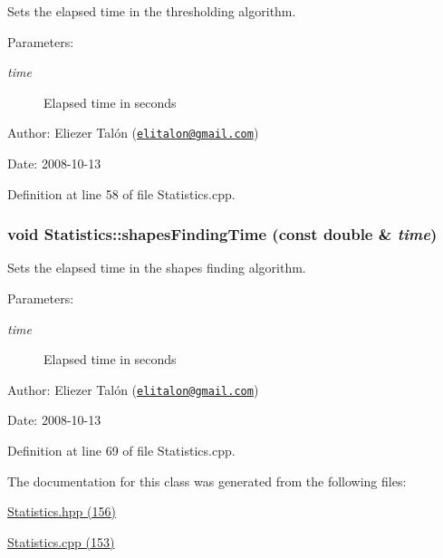 Sets the elapsed time in the thresholding algorithm. 

\begin{Desc}
\item[Parameters:]
\begin{description}
\item[{\em time}]Elapsed time in seconds\end{description}
\end{Desc}
\begin{Desc}
\item[Author:]Eliezer Talón (\href{mailto:elitalon@gmail.com}{\tt elitalon@gmail.com}) \end{Desc}
\begin{Desc}
\item[Date:]2008-10-13 \end{Desc}


Definition at line 58 of file Statistics.cpp.\hypertarget{class_statistics_bc0a0e96adba6828ffb915a617b58ed2}{
\subsubsection[shapesFindingTime]{\setlength{\rightskip}{0pt plus 5cm}void Statistics::shapesFindingTime (const double \& {\em time})}}
\label{class_statistics_bc0a0e96adba6828ffb915a617b58ed2}


Sets the elapsed time in the shapes finding algorithm. 

\begin{Desc}
\item[Parameters:]
\begin{description}
\item[{\em time}]Elapsed time in seconds\end{description}
\end{Desc}
\begin{Desc}
\item[Author:]Eliezer Talón (\href{mailto:elitalon@gmail.com}{\tt elitalon@gmail.com}) \end{Desc}
\begin{Desc}
\item[Date:]2008-10-13 \end{Desc}


Definition at line 69 of file Statistics.cpp.

The documentation for this class was generated from the following files:\begin{CompactItemize}
\item 
\hyperlink{_statistics_8hpp}{Statistics.hpp (156)}\item 
\hyperlink{_statistics_8cpp}{Statistics.cpp (153)}\end{CompactItemize}
